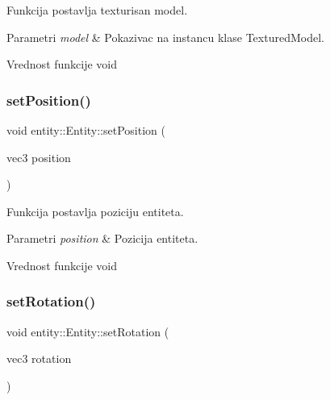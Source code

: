Funkcija postavlja texturisan model. 


\begin{DoxyParams}{Parametri}
{\em model} & Pokazivac na instancu klase Textured\+Model. \\
\hline
\end{DoxyParams}
\begin{DoxyReturn}{Vrednost funkcije}
void 
\end{DoxyReturn}
\mbox{\label{classentity_1_1Entity_abb5f477d3eac07d19f0545df10e3077c}} 
\subsubsection{\texorpdfstring{set\+Position()}{setPosition()}}
{\footnotesize\ttfamily void entity\+::\+Entity\+::set\+Position (\begin{DoxyParamCaption}\item[{vec3}]{position }\end{DoxyParamCaption})}



Funkcija postavlja poziciju entiteta. 


\begin{DoxyParams}{Parametri}
{\em position} & Pozicija entiteta. \\
\hline
\end{DoxyParams}
\begin{DoxyReturn}{Vrednost funkcije}
void 
\end{DoxyReturn}
\mbox{\label{classentity_1_1Entity_a830cb1b8769d11322844a34f1e480e4b}} 
\subsubsection{\texorpdfstring{set\+Rotation()}{setRotation()}}
{\footnotesize\ttfamily void entity\+::\+Entity\+::set\+Rotation (\begin{DoxyParamCaption}\item[{vec3}]{rotation }\end{DoxyParamCaption})}




